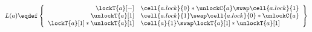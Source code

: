 %
\[
	L(a) \eqdef 
	\left\{
	\begin{array}{r l}
		\lockT{a}[-]&  \cell{a.lock}{0} * \unlockC{a}  \swap \cell{a.lock}{1}\\
		\unlockT{a}[1]&  \cell{a.lock}{1} \swap \cell{a.lock}{0} * \unlockC{a} \\
		\lockT{a}[1] * \unlockT{a}[1] &  \cell{a}{1} \swap \lockT{a}[1] * \unlockT{a}[1]
	\end{array}
	\right\}
\]
%
%		
%		
%		
%		
%				 	
